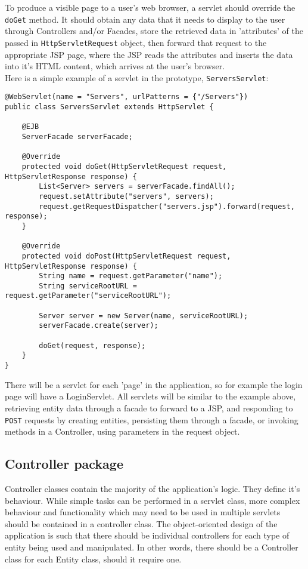 To produce a visible page to a user's web browser, a servlet should override the \texttt{doGet} method. It should obtain any data that it needs to display to the user through Controllers and/or Facades, store the retrieved data in 'attributes' of the passed in \texttt{HttpServletRequest} object, then forward that request to the appropriate JSP page, where the JSP reads the attributes and inserts the data into it's HTML content, which arrives at the user's browser.\\

Here is a simple example of a servlet in the prototype, \texttt{ServersServlet}:
\begin{small}\begin{verbatim}
@WebServlet(name = "Servers", urlPatterns = {"/Servers"})
public class ServersServlet extends HttpServlet {

    @EJB
    ServerFacade serverFacade;

    @Override
    protected void doGet(HttpServletRequest request, HttpServletResponse response) {
    	List<Server> servers = serverFacade.findAll();
    	request.setAttribute("servers", servers);
    	request.getRequestDispatcher("servers.jsp").forward(request, response);
    }

    @Override
    protected void doPost(HttpServletRequest request, HttpServletResponse response) {
    	String name = request.getParameter("name");
    	String serviceRootURL = request.getParameter("serviceRootURL");
    	
    	Server server = new Server(name, serviceRootURL);
    	serverFacade.create(server);
    	
    	doGet(request, response);
    }
}
\end{verbatim}\end{small}


There will be a servlet for each 'page' in the application, so for example the login page will have a LoginServlet.
All servlets will be similar to the example above, retrieving entity data through a facade to forward to a JSP, and responding to \texttt{POST} requests by creating entities, persisting them through a facade, or invoking methods in a Controller, using parameters in the request object.

\subsection{Controller package}
Controller classes contain the majority of the application's logic. They define it's behaviour. While simple tasks can be performed in a servlet class, more complex behaviour and functionality which may need to be used in multiple servlets should be contained in a controller class. The object-oriented design of the application is such that there should be individual controllers for each type of entity being used and manipulated. In other words, there should be a Controller class for each Entity class, should it require one.\\

